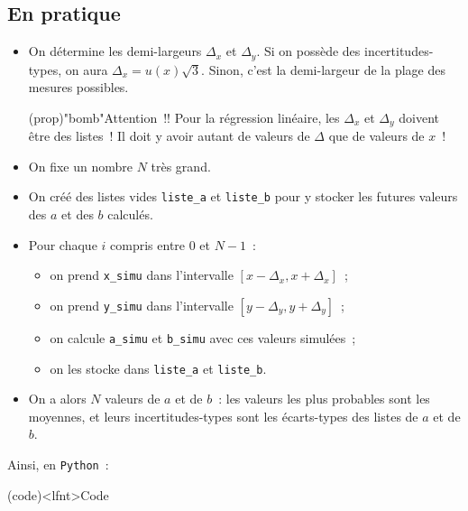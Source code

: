 \documentclass[a4paper, 12pt, garamond]{book}
\begin{document}
\subsection{En pratique}
\begin{itemize}
	\item On détermine les demi-largeurs $\Delta_x$ et $\Delta_y$. Si on possède
	      des incertitudes-types, on aura $\Delta_x = u(x)\sqrt{3}$. Sinon, c'est
	      la demi-largeur de la plage des mesures possibles.
	      \begin{center}
		      \begin{tcn}[cnt](prop)"bomb"{Attention~!!}
			      \Large Pour la régression linéaire, les $\Delta_x$ et $\Delta_y$
			      doivent être des listes~! Il doit y avoir autant de valeurs de
			      $\Delta$ que de valeurs de $x$~!
		      \end{tcn}
	      \end{center}
	\item On fixe un nombre $N$ très grand.
	\item On créé des listes vides \texttt{liste\_a} et \texttt{liste\_b} pour y
	      stocker les futures valeurs des $a$ et des $b$ calculés.
	\item Pour chaque $i$ compris entre $0$ et $N-1$~:
	      \begin{itemize}
		      \item on prend \texttt{x\_simu} dans l'intervalle $[x-\Delta_x,
					            x+\Delta_x]$~;
		      \item on prend \texttt{y\_simu} dans l'intervalle $[y-\Delta_y,
					            y+\Delta_y]$~;
		      \item on calcule \texttt{a\_simu} et \texttt{b\_simu} avec ces valeurs
		            simulées~;
		      \item on les stocke dans \texttt{liste\_a} et \texttt{liste\_b}.
	      \end{itemize}
	\item On a alors $N$ valeurs de $a$ et de $b$~: les valeurs les plus probables
	      sont les moyennes, et leurs incertitudes-types sont les écarts-types des
	      listes de $a$ et de $b$.
\end{itemize}

Ainsi, en \texttt{Python}~:
\begin{tcb}[breakable](code)<lfnt>{Code}
	\vspace{-10pt}
\end{tcb}
\end{document}
